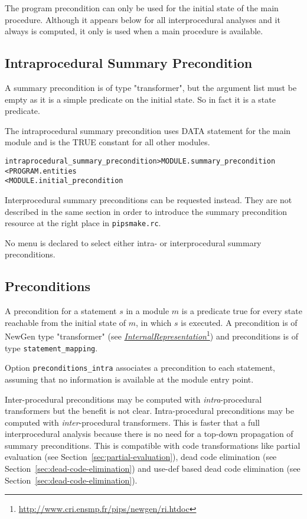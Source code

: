 \documentclass[a4paper]{report}
\newenvironment{PipsMake}{\begin{alltt}}{\end{alltt}}
\newcommand{\LINK}[2]{\href{#2}{#1}\footnote{\url{#2}}\xspace}
\newcommand{\Pri}{\LINK{\emph{Internal\space{}Representation}}{http://www.cri.ensmp.fr/pips/newgen/ri.htdoc}}
\begin{document}
The program precondition can only be used for the initial state of the
main procedure. Although it appears below for all interprocedural analyses
and it always is computed, it only is used when a main procedure is
available.

\subsection{Intraprocedural Summary Precondition}

A summary precondition is of type "transformer", but the argument list
must be empty as it is a simple predicate on the initial state. So in fact
it is a state predicate.

The intraprocedural summary precondition uses DATA statement for the main
module and is the TRUE constant for all other modules.

\begin{PipsMake}
intraprocedural_summary_precondition            > MODULE.summary_precondition
        < PROGRAM.entities
        < MODULE.initial_precondition
\end{PipsMake}

Interprocedural summary preconditions can be requested instead. They are
not described in the same section in order to introduce the summary
precondition resource at the right place in \verb/pipsmake.rc/.

No menu is declared to select either intra- or interprocedural summary
preconditions.

\subsection{Preconditions}
\label{subsubsection-preconditions}

A precondition for a statement $s$ in a module $m$ is a predicate true
for every state reachable from the initial state of $m$, in which $s$
is executed. A precondition is of NewGen type "transformer" (see
\Pri{}) and preconditions is of type \verb+statement_mapping+.

Option \verb+preconditions_intra+ associates a precondition to each
statement, assuming that no information is available at the module entry
point.

Inter-procedural preconditions may be computed with {\em
intra}-procedural transformers but the benefit is not
clear. Intra-procedural preconditions may be computed with {\em
inter}-procedural transformers. This is faster that a full
interprocedural analysis because there is no need for a top-down
propagation of summary preconditions. This is compatible with code
transformations like partial evaluation (see
Section~\ref{sec:partial-evaluation}), dead code elimination
(see Section~\ref{sec:dead-code-elimination}) and use-def
based dead code elimination (see
Section~\ref{sec:dead-code-elimination}).
\end{document}
